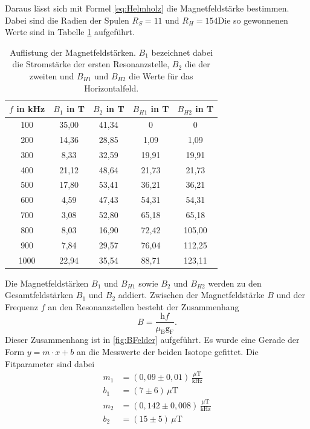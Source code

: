 Daraus lässt sich mit Formel \ref{eq:Helmholz} die Magnetfeldstärke bestimmen.
Dabei sind die Radien der Spulen $R_{S}=11$ und $R_H=154$Die
so gewonnenen Werte sind in Tabelle \ref{tab:Magnetwerte} aufgeführt.
\begin{table}[H]
    \centering
    \caption{Auflistung der Magnetfeldstärken. $B_1$ bezeichnet dabei die Stromstärke der
    ersten Resonanzstelle, $B_2$ die der zweiten und $B_{H1}$ und $B_{H2}$ die Werte für das Horizontalfeld.}
    \label{tab:Magnetwerte}
    \begin{tabular}{c|c|c|c|c}
        \toprule
        $f$ in kHz & $B_1$ in T & $B_2$ in T& $B_{H1}$ in T& $B_{H2}$ in T \\
        \midrule
        100& 35,00 & 41,34& 0 & 0 \\
        200& 14,36 &28,85& 1,09& 1,09\\
        300& 8,33 &32,59& 19,91&19,91\\
        400& 21,12 &48,64& 21,73&21,73\\
        500& 17,80 &53,41&  36,21& 36,21\\
        600& 4,59 &47,43& 54,31 &54,31\\
        700& 3,08 &52,80& 65,18 &65,18 \\
        800& 8,03 &16,90& 72,42 & 105,00\\
        900& 7,84  &29,57 & 76,04&112,25\\
        1000& 22,94 &35,54& 88,71& 123,11\\
        \bottomrule
    \end{tabular}
\end{table}
Die Magnetfeldstärken $B_1$ und $B_{H1}$ sowie $B_2$ und $B_{H2}$ werden zu den Gesamtfeldstärken
$B_1$ und $B_2$ addiert.
Zwischen der Magnetfeldstärke $B$ und der Frequenz $f$ an den Resonanzstellen besteht der Zusammenhang
\begin{equation}
  B=\frac{\text{h}f}{\mu_{\text{B}} \text{g}_{\text{F}}} .
\end{equation}
Dieser Zusammenhang ist in \ref{fig:BFelder} aufgeführt. Es wurde eine Gerade der
Form $y=m\cdot x+b$ an die Messwerte der beiden Isotope gefittet. Die Fitparameter sind dabei
\begin{align*}
  m_1&=(0,09 \pm 0,01)\,\frac{\mu\text{T}}{\text{kHz}} \\
  b_1&=(7 \pm 6)\,\mu\text{T}\\
  m_2&=(0,142 \pm 0,008)\,\frac{\mu\text{T}}{\text{kHz}} \\
  b_2&=(15 \pm 5)\,\mu\text{T}
\end{align*}
